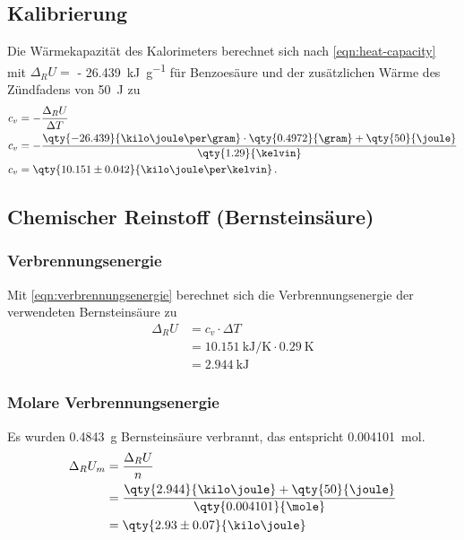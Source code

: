 \subsection{Kalibrierung}

Die Wärmekapazität des Kalorimeters berechnet sich nach \autoref{eqn:heat-capacity} mit $\Delta_R U = $ \qty{- 26.439}{\kilo\joule\per\gram} für Benzoesäure\autocite{skript_t1} und der zusätzlichen Wärme des Zündfadens von \qty{50}{\joule} zu
\begin{align*}
    c_v &= - \frac{\Delta_R U}{\Delta T} \\ 
    c_v &= - \frac{\qty{- 26.439}{\kilo\joule\per\gram}\cdot \qty{0.4972}{\gram} + \qty{50}{\joule}}{\qty{1.29}{\kelvin}} \\
    c_v &= \qty{10.151 \pm 0.042}{\kilo\joule\per\kelvin}\, \text{.}
\end{align*}

\subsection{Chemischer Reinstoff (Bernsteinsäure)}
\subsubsection{Verbrennungsenergie}
Mit \autoref{eqn:verbrennungsenergie} berechnet sich die Verbrennungsenergie der verwendeten Bernsteinsäure zu
\begin{align*}
    \Delta_R U &= c_v \cdot \Delta T \\
               &= \qty{10.151}{\kilo\joule\per\kelvin} \cdot \qty{0.29}{\kelvin} \\
               &= \qty{2.944}{\kilo\joule}
\end{align*}

\subsubsection{Molare Verbrennungsenergie}
Es wurden \qty{0.4843}{\gram} Bernsteinsäure verbrannt, das entspricht \qty{0.004101}{\mole}.
\begin{align*}    
    \Delta_R U_m &= \frac{\Delta_R U}{n} \label{eqn:molare-verbrennungsenergie} \\
                 &= \frac{\qty{2.944}{\kilo\joule} + \qty{50}{\joule}}{\qty{0.004101}{\mole}} \\
                 &= \qty{2.93 \pm 0.07}{\kilo\joule}
\end{align*}

